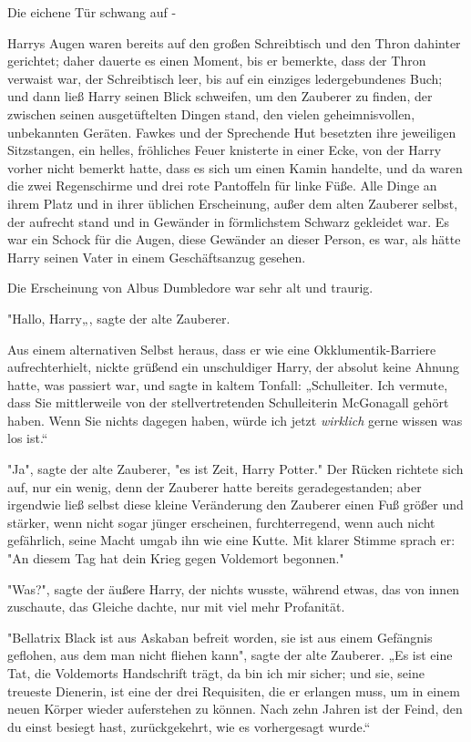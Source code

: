 {Die eichene Tür schwang auf -

Harrys Augen waren bereits auf den großen Schreibtisch und den Thron dahinter gerichtet; daher dauerte es einen Moment, bis er bemerkte, dass der Thron verwaist war, der Schreibtisch leer, bis auf ein einziges ledergebundenes Buch; und dann ließ Harry seinen Blick schweifen, um den Zauberer zu finden, der zwischen seinen ausgetüftelten Dingen stand, den vielen geheimnisvollen, unbekannten Geräten. Fawkes und der Sprechende Hut besetzten ihre jeweiligen Sitzstangen, ein helles, fröhliches Feuer knisterte in einer Ecke, von der Harry vorher nicht bemerkt hatte, dass es sich um einen Kamin handelte, und da waren die zwei Regenschirme und drei rote Pantoffeln für linke Füße. Alle Dinge an ihrem Platz und in ihrer üblichen Erscheinung, außer dem alten Zauberer selbst, der aufrecht stand und in Gewänder in förmlichstem Schwarz gekleidet war. Es war ein Schock für die Augen, diese Gewänder an dieser Person, es war, als hätte Harry seinen Vater in einem Geschäftsanzug gesehen.

Die Erscheinung von Albus Dumbledore war sehr alt und traurig.

"Hallo, Harry„, sagte der alte Zauberer.

Aus einem alternativen Selbst heraus, dass er wie eine Okklumentik-Barriere aufrechterhielt, nickte grüßend ein unschuldiger Harry, der absolut keine Ahnung hatte, was passiert war, und sagte in kaltem Tonfall: „Schulleiter. Ich vermute, dass Sie mittlerweile von der stellvertretenden Schulleiterin McGonagall gehört haben. Wenn Sie nichts dagegen haben, würde ich jetzt \emph{wirklich} gerne wissen was los ist.“

"Ja", sagte der alte Zauberer, "es ist Zeit, Harry Potter." Der Rücken richtete sich auf, nur ein wenig, denn der Zauberer hatte bereits geradegestanden; aber irgendwie ließ selbst diese kleine Veränderung den Zauberer einen Fuß größer und stärker, wenn nicht sogar jünger erscheinen, furchterregend, wenn auch nicht gefährlich, seine Macht umgab ihn wie eine Kutte. Mit klarer Stimme sprach er: "An diesem Tag hat dein Krieg gegen Voldemort begonnen."

"Was?", sagte der äußere Harry, der nichts wusste, während etwas, das von innen zuschaute, das Gleiche dachte, nur mit viel mehr Profanität.

"Bellatrix Black ist aus Askaban befreit worden, sie ist aus einem Gefängnis geflohen, aus dem man nicht fliehen kann", sagte der alte Zauberer. „Es ist eine Tat, die Voldemorts Handschrift trägt, da bin ich mir sicher; und sie, seine treueste Dienerin, ist eine der drei Requisiten, die er erlangen muss, um in einem neuen Körper wieder auferstehen zu können. Nach zehn Jahren ist der Feind, den du einst besiegt hast, zurückgekehrt, wie es vorhergesagt wurde.“

}
